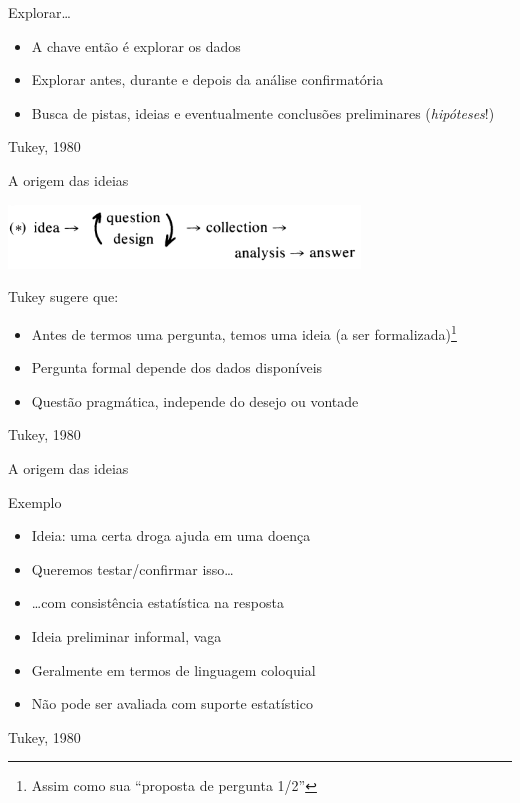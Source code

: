 \documentclass{beamer}
\begin{document}
\begin{frame}{Explorar\ldots}
  \begin{itemize}
    \footnotesize
  \item A chave então é explorar os dados
    \bigskip
  \item Explorar antes, durante e depois da análise confirmatória
    \bigskip
  \item Busca de pistas, ideias e eventualmente conclusões
    preliminares ({\em hipóteses}!)
  \end{itemize}

  \vfill
  \scriptsize
  \hfill Tukey, 1980
\end{frame}

\begin{frame}{A origem das ideias}
  \begin{center}
    \includegraphics[width=0.7\textwidth]{EDA/eda-tukey2}
  \end{center}
  \scriptsize
  Tukey sugere que:
  \bigskip
  \begin{itemize}
    \footnotesize
  \item Antes de termos uma pergunta, temos uma ideia (a ser
    formalizada)\footnote{\scriptsize Assim como sua ``proposta de pergunta 1/2''}
    \bigskip
  \item Pergunta formal depende dos dados disponíveis
    \bigskip
  \item Questão pragmática, independe do desejo ou vontade
  \end{itemize}

  \vfill
  \scriptsize
  \hfill Tukey, 1980
\end{frame}

\begin{frame}{A origem das ideias}
  \begin{exampleblock}{Exemplo}
    \begin{itemize}
      \scriptsize
    \item<1-> Ideia: uma certa droga ajuda em uma doença
    \item<2-> Queremos testar/confirmar isso\ldots
    \item<3-> \ldots com consistência estatística na resposta
    \end{itemize}
  \end{exampleblock}
  \bigskip
  \begin{itemize}
  \item<1-> Ideia preliminar informal, vaga
    \bigskip
  \item<1-> Geralmente em termos de linguagem coloquial
    \bigskip
  \item<3-> Não pode ser avaliada com suporte estatístico
  \end{itemize}

  \vfill
  \scriptsize
  \hfill Tukey, 1980
\end{frame}
\end{document}
